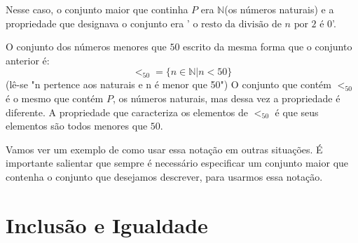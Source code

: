 Nesse caso, o conjunto maior que continha $P$ era $\mathbb{N}$(os números naturais) e a propriedade que designava o conjunto era '$\text{ o resto da divisão de } n \text{ por } 2 \text{ é } 0$'. 

O conjunto dos números menores que $50$ escrito da mesma forma que o conjunto anterior é:$$<_{50} = \{ n \in \mathbb{N} | n < 50\}$$(lê-se "n pertence aos naturais e n é menor que 50")
O conjunto que contém $<_{50}$ é o mesmo que contém $P$, os números naturais, mas dessa vez a propriedade é diferente. A propriedade que caracteriza os elementos de $<_{50}$ é que seus elementos são todos menores que $50$.

Vamos ver um exemplo de como usar essa notação em outras situações. 
 É importante salientar que sempre é necessário especificar um conjunto maior que contenha o conjunto que desejamos descrever, para usarmos essa notação.
\section{Inclusão e Igualdade}
